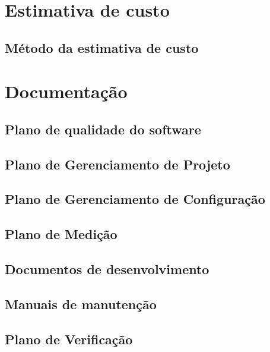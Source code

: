\section{Estimativa de custo}

\subsection{Método da estimativa de custo}

\section{Documentação}

\subsection{Plano de qualidade do software}

\subsection{Plano de Gerenciamento de Projeto}

\subsection{Plano de Gerenciamento de Configuração}

\subsection{Plano de Medição}

\subsection{Documentos de desenvolvimento}

\subsection{Manuais de manutenção}

\subsection{Plano de Verificação}

